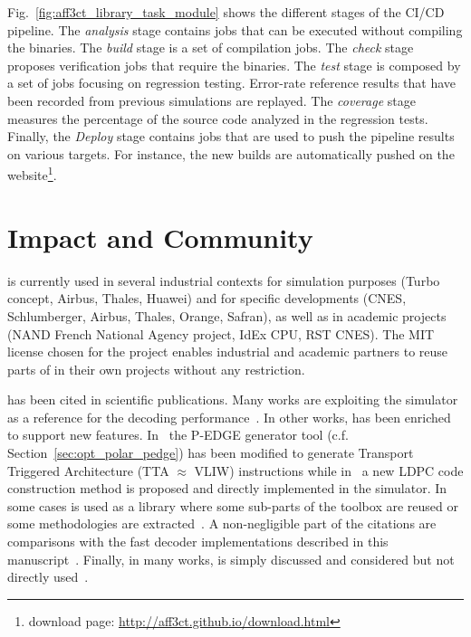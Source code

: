 Fig.~\ref{fig:aff3ct_library_task_module} shows the different stages of the
\AFFECT CI/CD pipeline. The \emph{analysis} stage contains jobs that can be
executed without compiling the \AFFECT binaries. The \emph{build} stage is a set
of compilation jobs. The \emph{check} stage proposes verification jobs that
require the \AFFECT binaries. The \emph{test} stage is composed by a set of jobs
focusing on regression testing. Error-rate reference results that have been
recorded from previous simulations are replayed. The \emph{coverage} stage
measures the percentage of the \AFFECT source code analyzed in the regression
tests. Finally, the \emph{Deploy} stage contains jobs that are used to push the
pipeline results on various targets. For instance, the new builds are
automatically pushed on the \AFFECT website\footnote{\AFFECT download page:
\url{http://aff3ct.github.io/download.html}}.

\section{Impact and Community}
\label{sec:aff3ct_impact}

\AFFECT is currently used in several industrial contexts for simulation purposes
(Turbo concept, Airbus, Thales, Huawei) and for specific developments (CNES,
Schlumberger, Airbus, Thales, Orange, Safran), as well as in academic projects
(NAND French National Agency project, IdEx CPU, RST CNES). The MIT license
chosen for the project enables industrial and academic partners to reuse parts
of \AFFECT in their own projects without any restriction.

\AFFECT has been cited in scientific publications. Many works are exploiting the
\AFFECT simulator as a reference for the decoding performance~\cite{Pignoly2018,
Poulenard2018,Ghanaatian2018,Wang2019,Hsieh2020,Rush2020,Duffy2020}. In other
works, \AFFECT has been enriched to support new features.
In~\cite{Leonardon2018b} the P-EDGE generator tool (c.f.
Section~\ref{sec:opt_polar_pedge}) has been modified to generate Transport
Triggered Architecture (TTA $\approx$ VLIW) instructions while
in~\cite{Tasdighi2020} a new LDPC code construction method is proposed and
directly implemented in the \AFFECT simulator. In some cases \AFFECT is used as
a library where some sub-parts of the toolbox are reused or some methodologies
are extracted~\cite{Florian2018,Cavatassi2019a,Cavatassi2019b,Ercan2020}. A
non-negligible part of the citations are comparisons with the fast decoder
implementations described in this manuscript~\cite{Zeng2017,Leonardon2018a,
Guermouche2019,LeGal2019a,Shen2020}. Finally, in many works, \AFFECT is simply
discussed and considered but not directly used~\cite{Debbabi2016,Debbabi2016a,
Ercan2017,Natarajan2018,Cenova2019,Krainyk2019,Vameghestahbanati2019,
Mohammed2019,Shaheen2019,Aly2019,Delomier2020}.

